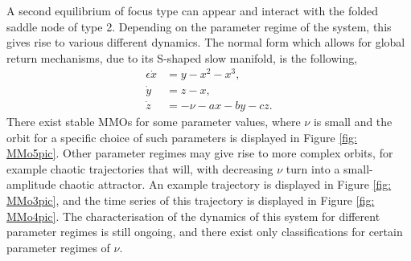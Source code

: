 A second equilibrium of focus type can appear and interact with the folded saddle node of type 2.
Depending on the parameter regime of the system, this gives rise to various different dynamics.
The normal form which allows for global return mechanisms, due to its S-shaped slow manifold, is the following,
\begin{align*}
\epsilon \dot{x} &= y - x^2 - x^3, \\
\dot{y} &= z - x, \\
\dot{z} &= -\nu -ax -by -cz.
\end{align*}
There exist stable MMOs for some parameter values, where $\nu$ is small and the orbit for a specific choice of such parameters is displayed in Figure \ref{fig: MMo5pic}. Other parameter regimes may give rise to more complex orbits, for example chaotic trajectories that will, with decreasing $\nu$ turn into a small-amplitude chaotic attractor. An example trajectory is displayed in Figure \ref{fig: MMo3pic}, and the time series of this trajectory is displayed in Figure \ref{fig: MMo4pic}. The characterisation of the dynamics of this system for different parameter regimes is still ongoing, and there exist only classifications for certain parameter regimes of $\nu$.


